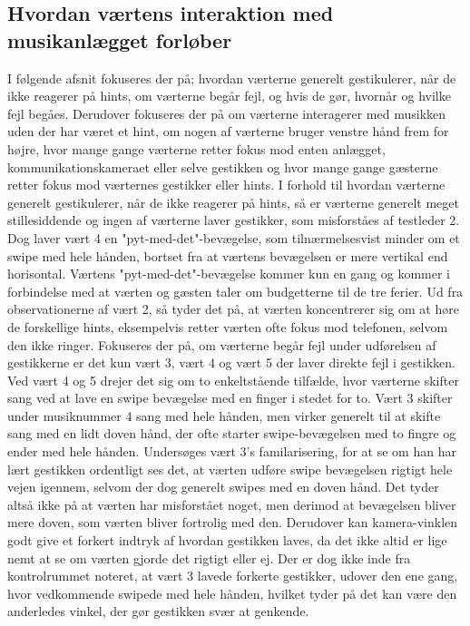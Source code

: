 \subsection{Hvordan værtens interaktion med musikanlægget forløber}
\label{TestresultaterSocialAcceptVaertsGestikker}
%
I følgende afsnit fokuseres der på; hvordan værterne generelt gestikulerer, når de ikke reagerer på hints, om værterne begår fejl, og hvis de gør, hvornår og hvilke fejl begåes. Derudover fokuseres der på om værterne interagerer med musikken uden der har været et hint, om nogen af værterne bruger venstre hånd frem for højre, hvor mange gange værterne retter fokus mod enten anlægget, kommunikationskameraet eller selve gestikken og hvor mange gange gæsterne retter fokus mod værternes gestikker eller hints.\blankline
%
I forhold til hvordan værterne generelt gestikulerer, når de ikke reagerer på hints, så er værterne generelt meget stillesiddende og ingen af værterne laver gestikker, som misforståes af testleder 2. Dog laver vært 4 en "pyt-med-det"-bevægelse, som tilnærmelsesvist minder om et swipe med hele hånden, bortset fra at værtens bevægelsen er mere vertikal end horisontal. Værtens "pyt-med-det"-bevægelse kommer kun en gang og kommer i forbindelse med at værten og gæsten taler om budgetterne til de tre ferier. Ud fra observationerne af vært 2, så tyder det på, at værten koncentrerer sig om at høre de forskellige hints, eksempelvis retter værten ofte fokus mod telefonen, selvom den ikke ringer.\blankline
%
Fokuseres der på, om værterne begår fejl under udførelsen af gestikkerne er det kun vært 3, vært 4 og vært 5 der laver direkte fejl i gestikken. Ved vært 4 og 5 drejer det sig om to enkeltstående tilfælde, hvor værterne skifter sang ved at lave en swipe bevægelse med en finger i stedet for to. Vært 3 skifter under musiknummer 4 sang med hele hånden, men virker generelt til at skifte sang med en lidt doven hånd, der ofte starter swipe-bevægelsen med to fingre og ender med hele hånden. Undersøges vært 3's familarisering, for at se om han har lært gestikken ordentligt ses det, at værten udføre swipe bevægelsen rigtigt hele vejen igennem, selvom der dog generelt swipes med en doven hånd. Det tyder altså ikke på at værten har misforstået noget, men derimod at bevægelsen bliver mere doven, som værten bliver fortrolig med den. Derudover kan kamera-vinklen godt give et forkert indtryk af hvordan gestikken laves, da det ikke altid er lige nemt at se om værten gjorde det rigtigt eller ej. Der er dog ikke inde fra kontrolrummet noteret, at vært 3 lavede forkerte gestikker, udover den ene gang, hvor vedkommende swipede med hele hånden, hvilket tyder på det kan være den anderledes vinkel, der gør gestikken svær at genkende. 

